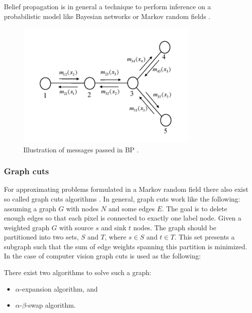 Belief propagation is in general a technique to perform inference on a probabilistic model like Bayesian networks or Markov random fields \citep{yedidia2003understanding, tappen2003comparison, cyganek2011introduction}.

\begin{figure}[h!]
  \centering
  \includegraphics[width=0.8\textwidth]{src/images/belief-propagation.png}
  \caption[Illustration of messages passed in BP.]{Illustration of messages passed in BP \citep{yedidia2003understanding}.}
  \label{fig:markov}
\end{figure}

\subsubsection{Graph cuts}

For approximating problems formulated in a Markov random field there also exist so called graph cuts algorithms \citep{boykov2001fast, cyganek2011introduction}.
In general, graph cuts work like the following: assuming a graph $G$ with nodes $N$ and some edges $E$.
The goal is to delete enough edges so that each pixel is connected to exactly one label node.
Given a weighted graph $G$ with source $s$ and sink $t$ nodes.
The graph should be partitioned into two sets, $S$ and $T$, where $s \in S$ and $t \in T$.
This set presents a subgraph such that the sum of edge weights spanning this partition is minimized.
\newline\newline\noindent In the case of computer vision graph cuts is used as the following:


There exist two algorithms to solve such a graph:
\begin{itemize}
  \item $\alpha$-expansion algorithm, and
  \item $\alpha$-$\beta$-swap algorithm.
\end{itemize}

